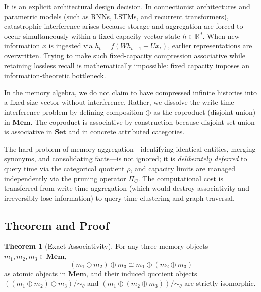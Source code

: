 \documentclass[11pt,a4paper]{article}
\theoremstyle{definition}
\newtheorem{theorem}{Theorem}[section]
\begin{document}
It is an explicit architectural design decision.
In connectionist architectures and parametric models (such as RNNs, LSTMs, and recurrent transformers), catastrophic interference arises because storage and aggregation are forced to occur simultaneously within a fixed-capacity vector state $h \in \mathbb{R}^d$. When new information $x$ is ingested via $h_t = f(W h_{t-1} + U x_t)$, earlier representations are overwritten. Trying to make such fixed-capacity compression associative while retaining lossless recall is mathematically impossible: fixed capacity imposes an information-theoretic bottleneck.

In the memory algebra, we do not claim to have compressed infinite histories into a fixed-size vector without interference. Rather, we dissolve the write-time interference problem by defining composition $\oplus$ as the coproduct (disjoint union) in $\mathbf{Mem}$. The coproduct is associative by construction because disjoint set union is associative in $\mathbf{Set}$ and in concrete attributed categories.

The hard problem of memory aggregation---identifying identical entities, merging synonyms, and consolidating facts---is not ignored; it is \emph{deliberately deferred} to query time via the categorical quotient $\rho$, and capacity limits are managed independently via the pruning operator $\Pi_C$. The computational cost is transferred from write-time aggregation (which would destroy associativity and irreversibly lose information) to query-time clustering and graph traversal.

\subsection{Theorem and Proof}

\begin{theorem}[Exact Associativity]
For any three memory objects $m_1, m_2, m_3 \in \mathbf{Mem}$,
\[
(m_1 \oplus m_2) \oplus m_3 \cong m_1 \oplus (m_2 \oplus m_3)
\]
as atomic objects in $\mathbf{Mem}$, and their induced quotient objects $( (m_1 \oplus m_2) \oplus m_3 ) / \sim_\theta$ and $( m_1 \oplus (m_2 \oplus m_3) ) / \sim_\theta$ are strictly isomorphic.
\end{theorem}
\end{document}
